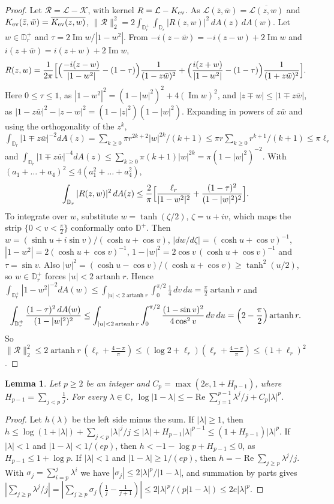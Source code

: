 \documentclass[11pt]{amsart}
\newtheorem{lemma}[theorem]{Lemma}
\theoremstyle{definition}
\theoremstyle{remark}
\numberwithin{equation}{section}
\newcommand{\C}{\mathbb{C}}
\newcommand{\D}{\mathbb{D}}
\DeclareMathOperator{\re}{Re}
\DeclareMathOperator{\im}{Im}
\begin{document}
\begin{proof}
Let $\mathcal R=\mathcal L-\mathcal K$, with kernel $R=\mathcal L-K_{\rm ev}$. As $\mathcal L(\bar z,\bar w)=\overline{\mathcal L(z,w)}$ and $K_{\rm ev}(\bar z,\bar w)=\overline{K_{\rm ev}(z,w)}$, $\|\mathcal R\|_2^2=2\int_{\D_r^+}\int_{\D_r}|R(z,w)|^2\,dA(z)\,dA(w)$. Let $w\in\D_r^+$ and $\tau=2\im w/|1-w^2|$. From $-i(z-\bar w)=-i(z-w)+2\im w$ and $i(z+\bar w)=i(z+w)+2\im w$,
\[
R(z,w)=\frac1{2\pi}\Bigl[\Bigl(\frac{-i(z-w)}{|1-w^2|}-(1-\tau)\Bigr)\frac1{(1-z\bar w)^2}+\Bigl(\frac{i(z+w)}{|1-w^2|}-(1-\tau)\Bigr)\frac1{(1+z\bar w)^2}\Bigr].
\]
Here $0\le\tau\le1$, as $|1-w^2|^2=(1-|w|^2)^2+4(\im w)^2$, and $|z\mp w|\le|1\mp z\bar w|$, as $|1-z\bar w|^2-|z-w|^2=(1-|z|^2)(1-|w|^2)$. Expanding in powers of $z\bar w$ and using the orthogonality of the $z^k$, $\int_{\D_r}|1\mp z\bar w|^{-2}dA(z)=\sum_{k\ge0}\pi r^{2k+2}|w|^{2k}/(k+1)\le\pi r\sum_{k\ge0}r^{k+1}/(k+1)\le\pi\ell_r$ and $\int_{\D_r}|1\mp z\bar w|^{-4}dA(z)\le\sum_{k\ge0}\pi(k+1)|w|^{2k}=\pi(1-|w|^2)^{-2}$. With $(a_1+\dots+a_4)^2\le4(a_1^2+\dots+a_4^2)$,
\[
\int_{\D_r}|R(z,w)|^2\,dA(z)\le\frac2\pi\Bigl[\frac{\ell_r}{|1-w^2|^2}+\frac{(1-\tau)^2}{(1-|w|^2)^2}\Bigr].
\]
To integrate over $w$, substitute $w=\tanh(\zeta/2)$, $\zeta=u+iv$, which maps the strip $\{0<v<\frac\pi2\}$ conformally onto $\D^+$. Then $w=(\sinh u+i\sin v)/(\cosh u+\cos v)$, $|dw/d\zeta|=(\cosh u+\cos v)^{-1}$, $|1-w^2|=2(\cosh u+\cos v)^{-1}$, $1-|w|^2=2\cos v\,(\cosh u+\cos v)^{-1}$ and $\tau=\sin v$. Also $|w|^2=(\cosh u-\cos v)/(\cosh u+\cos v)\ge\tanh^2(u/2)$, so $w\in\D_r^+$ forces $|u|<2\operatorname{artanh}r$. Hence $\int_{\D_r^+}|1-w^2|^{-2}dA(w)\le\int_{|u|<2\operatorname{artanh}r}\int_0^{\pi/2}\frac14\,dv\,du=\frac\pi2\operatorname{artanh}r$ and
\[
\int_{\D_r^+}\frac{(1-\tau)^2\,dA(w)}{(1-|w|^2)^2}\le\int_{|u|<2\operatorname{artanh}r}\int_0^{\pi/2}\frac{(1-\sin v)^2}{4\cos^2v}\,dv\,du=\Bigl(2-\frac\pi2\Bigr)\operatorname{artanh}r .
\]
So $\|\mathcal R\|_2^2\le2\operatorname{artanh}r\,(\ell_r+\frac{4-\pi}\pi)\le(\log2+\ell_r)(\ell_r+\frac{4-\pi}\pi)\le(1+\ell_r)^2$.
\end{proof}

\begin{lemma}\label{lem:log-ineq}
Let $p\ge2$ be an integer and $C_p=\max(2e,1+H_{p-1})$, where $H_{p-1}=\sum_{j<p}\frac1j$. For every $\lambda\in\C$, $\log|1-\lambda|\le-\re\sum_{j=1}^{p-1}\lambda^j/j+C_p|\lambda|^p$.
\end{lemma}

\begin{proof}
Let $h(\lambda)$ be the left side minus the sum. If $|\lambda|\ge1$, then $h\le\log(1+|\lambda|)+\sum_{j<p}|\lambda|^j/j\le|\lambda|+H_{p-1}|\lambda|^{p-1}\le(1+H_{p-1})|\lambda|^p$. If $|\lambda|<1$ and $|1-\lambda|<1/(ep)$, then $h<-1-\log p+H_{p-1}\le0$, as $H_{p-1}\le1+\log p$. If $|\lambda|<1$ and $|1-\lambda|\ge1/(ep)$, then $h=-\re\sum_{j\ge p}\lambda^j/j$. With $\sigma_j=\sum_{i=p}^j\lambda^i$ we have $|\sigma_j|\le2|\lambda|^p/|1-\lambda|$, and summation by parts gives $|\sum_{j\ge p}\lambda^j/j|=|\sum_{j\ge p}\sigma_j(\frac1j-\frac1{j+1})|\le2|\lambda|^p/(p|1-\lambda|)\le2e|\lambda|^p$.
\end{proof}
\end{document}
